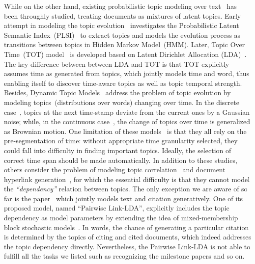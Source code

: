While on the other hand, existing probabilistic topic modeling over
text~\cite{blei2003latent,griffiths2004finding,hofmann2001unsupervised} has been
throughly studied, treating documents as mixtures of latent topics.  Early
attempt in modeling the topic evolution~\cite{mei2005discovering} investigates
the Probabilistic Latent Semantic Index~(PLSI)~\cite{hofmann2001unsupervised} to
extract topics and models the evolution process as transitions between topics in
Hidden Markov Model~(HMM).  Later, Topic Over Time~(TOT)
model~\cite{wang2006topics} is developed based on Latent Dirichlet
Allocation (LDA)~\cite{blei2003latent}. The key difference between between LDA
and TOT is that TOT explicitly assumes time as generated from topics, which
jointly models time and word, thus enabling itself to discover time-aware topics
as well as topic temporal strength.  Besides, Dynamic Topic
Models~\cite{blei2006dynamic,wang2012continuous} address the problem of topic
evolution by modeling topics~(distributions over words) changing over time. In
the discrete case~\cite{blei2006dynamic}, topics at the next time-stamp deviate
from the current ones by a Gaussian noise; while, in the continuous
case~\cite{wang2012continuous}, the change of topics over time is generalized as
Brownian motion.  One limitation of these models~\cite{blei2006dynamic,
mei2005discovering,wang2012continuous,wang2006topics} is that they all rely on
the pre-segmentation of time: without appropriate time granularity selected,
they could fall into difficulty in finding important topics. Ideally, the
selection of correct time span should be made automatically.  In addition to
these studies, others consider the problem of modeling topic
correlation~\cite{blei2007correlated} and document hyperlink
generation~\cite{chang2009relational}, for which the essential difficulty is
that they cannot model the \emph{``dependency''} relation between topics. The
only exception we are aware of so far is the paper~\cite{nallapati2008joint}
which jointly models text and citation generatively. One of its proposed model,
named ``Pairwise Link-LDA'', explicitly includes the topic dependency as model
parameters by extending the idea of mixed-membership block stochastic
models~\cite{airoldi2006mixed}. In words, the chance of generating a particular
citation is determined by the topics of citing and cited documents, which indeed
addresses the topic dependency directly. Nevertheless, the Pairwise Link-LDA is
not able to fulfill all the tasks we listed such as recognizing the milestone
papers and so on.


